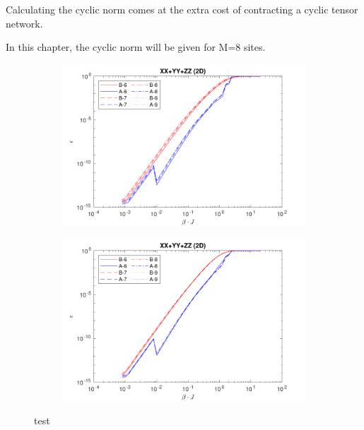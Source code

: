 Calculating the cyclic norm comes at the extra cost of contracting a cyclic tensor network. 

In this chapter, the cyclic norm will be given for M=8 sites.

\begin{figure}[H]
    \begin{subfigure}[]{\textwidth}
        \includegraphics[width=\textwidth]{Figuren/benchmarking/keuze_norm/linear.pdf}
    \end{subfigure}

    \begin{subfigure}[]{\textwidth}
        \includegraphics[width=\textwidth]{Figuren/benchmarking/keuze_norm/cyclic.pdf}
    \end{subfigure}
    \caption{test }
    \label{benchmarking:systemsize}
\end{figure}



